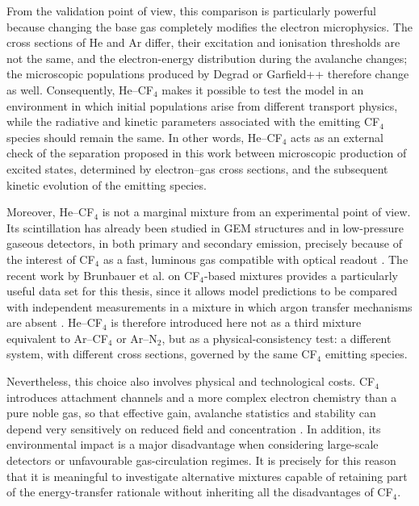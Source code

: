 \documentclass[12pt,a4paper]{article}
\begin{document}
From the validation point of view, this comparison is particularly powerful because changing the base gas completely modifies the electron microphysics. The cross sections of He and Ar differ, their excitation and ionisation thresholds are not the same, and the electron-energy distribution during the avalanche changes; the microscopic populations produced by Degrad or Garfield++ therefore change as well. Consequently, He--CF$_4$ makes it possible to test the model in an environment in which initial populations arise from different transport physics, while the radiative and kinetic parameters associated with the emitting CF$_4$ species should remain the same. In other words, He--CF$_4$ acts as an external check of the separation proposed in this work between microscopic production of excited states, determined by electron--gas cross sections, and the subsequent kinetic evolution of the emitting species.

Moreover, He--CF$_4$ is not a marginal mixture from an experimental point of view. Its scintillation has already been studied in GEM structures and in low-pressure gaseous detectors, in both primary and secondary emission, precisely because of the interest of CF$_4$ as a fast, luminous gas compatible with optical readout \cite{fraga2003the,FlorianPrimarySecundary}. The recent work by Brunbauer et al. on CF$_4$-based mixtures provides a particularly useful data set for this thesis, since it allows model predictions to be compared with independent measurements in a mixture in which argon transfer mechanisms are absent \cite{FlorianPrimarySecundary}. He--CF$_4$ is therefore introduced here not as a third mixture equivalent to Ar--CF$_4$ or Ar--N$_2$, but as a physical-consistency test: a different system, with different cross sections, governed by the same CF$_4$ emitting species.

Nevertheless, this choice also involves physical and technological costs. CF$_4$ introduces attachment channels and a more complex electron chemistry than a pure noble gas, so that effective gain, avalanche statistics and stability can depend very sensitively on reduced field and concentration \cite{christophorou1999electron,tsiledakis2004drift}. In addition, its environmental impact is a major disadvantage when considering large-scale detectors or unfavourable gas-circulation regimes. It is precisely for this reason that it is meaningful to investigate alternative mixtures capable of retaining part of the energy-transfer rationale without inheriting all the disadvantages of CF$_4$.
\end{document}
